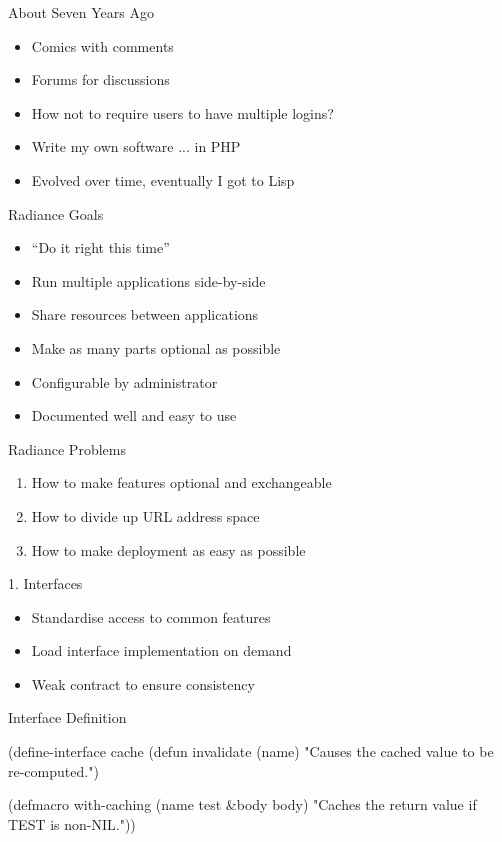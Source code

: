 \documentclass[14pt]{beamer}
\renewcommand{\title}[1]{
  {\huge #1} \vskip 0.4cm
}
\begin{document}
\begin{frame}
  \title{About Seven Years Ago}
  \begin{itemize}
  \item Comics with comments
  \item Forums for discussions
  \item How not to require users to have multiple logins?
  \item Write my own software \pause ... in PHP
  \item Evolved over time, eventually I got to Lisp
  \end{itemize}
\end{frame}

\begin{frame}
  \title{Radiance Goals}
  \begin{itemize}
  \item ``Do it right this time''
  \item Run multiple applications side-by-side
  \item Share resources between applications
  \item Make as many parts optional as possible
  \item Configurable by administrator
  \item Documented well and easy to use
  \end{itemize}
\end{frame}

\begin{frame}
  \title{Radiance Problems}
  \begin{enumerate}
  \item How to make features optional and exchangeable
  \item How to divide up URL address space
  \item How to make deployment as easy as possible
  \end{enumerate}
\end{frame}

\begin{frame}
  \title{1. Interfaces}
  \begin{itemize}
  \item Standardise access to common features
  \item Load interface implementation on demand
  \item Weak contract to ensure consistency
  \end{itemize}
\end{frame}

\begin{frame}[fragile]
  \title{Interface Definition}
\begin{lispcode}
(define-interface cache
  (defun invalidate (name)
    "Causes the cached value to be re-computed.")

  (defmacro with-caching (name test &body body)
    "Caches the return value if TEST is non-NIL."))
\end{lispcode}
\end{frame}
\end{document}
